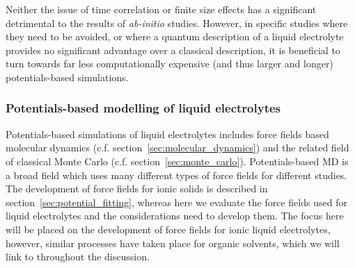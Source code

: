 \documentclass[../main.tex]{subfiles}
\begin{document}
Neither the issue of time correlation or finite size effects has a significant detrimental to the results of \textit{ab-initio} studies. However, in specific studies where they need to be avoided, or where a quantum description of a liquid electrolyte provides no significant advantage over a classical description, it is beneficial to turn towards far less computationally expensive (and thus larger and longer) potentials-based simulations.

\subsubsection{Potentials-based modelling of liquid electrolytes}
Potentials-based simulations of liquid electrolytes includes force fields based molecular dynamics (c.f. section~\ref{sec:molecular_dynamics}) and the related field of classical Monte Carlo (c.f. section~\ref{sec:monte_carlo}). %
Potentials-based MD is a broad field which uses many different types of force fields for different studies. The development of force fields for ionic solids is described in section~\ref{sec:potential_fitting}, whereas here we evaluate the force fields used for liquid electrolytes and the considerations need to develop them. The focus here will be placed on the development of force fields for ionic liquid electrolytes, however, similar processes have taken place for organic solvents, which we will link to throughout the discussion.
\end{document}
